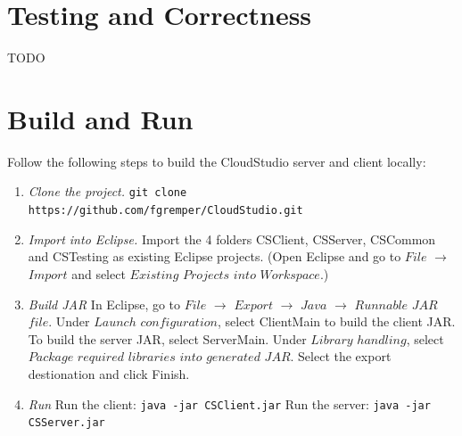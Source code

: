 \section{Testing and Correctness}

TODO


\section{Build and Run}

Follow the following steps to build the CloudStudio server and client locally:

\begin{enumerate}


\item \emph{Clone the project.} \newline
\texttt{git clone https://github.com/fgremper/CloudStudio.git}
\item \emph{Import into Eclipse.} \newline Import the 4 folders CSClient, CSServer, CSCommon and CSTesting as existing Eclipse projects. (Open Eclipse and go to $File$ $\rightarrow$ $Import$ and select $Existing$ $Projects$ $into$ $Workspace$.)
\item \emph{Build JAR} \newline
In Eclipse, go to $File$ $\rightarrow$ $Export$ $\rightarrow$ $Java$ $\rightarrow$ $Runnable$ $JAR$ $file$.
Under $Launch$ $configuration$, select ClientMain to build the client JAR. To build the server JAR, select ServerMain. Under $Library$ $handling$, select $Package$ $required$ $libraries$ $into$ $generated$ $JAR$.
Select the export destionation and click Finish.
\item \emph{Run} \newline
Run the client:
\texttt{java -jar CSClient.jar} \newline
Run the server:
\texttt{java -jar CSServer.jar}

\end{enumerate}
